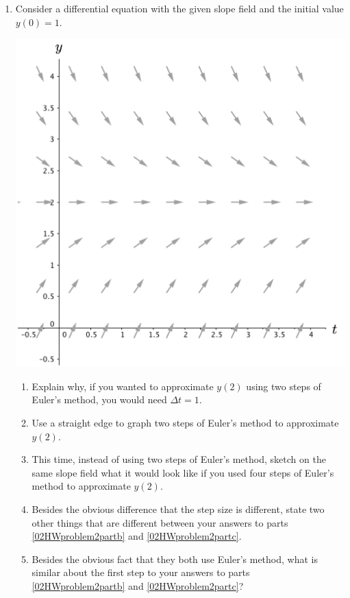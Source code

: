 \begin{enumerate}

\clearpage

\item Consider a differential equation with the given slope field and the initial value $y(0)=1$. \label{02HWproblem2}
\begin{center}
\includegraphics[width=5in]{02/02HWSlopeField2.png}
\end{center}
\begin{enumerate}
\item Explain why, if you wanted to approximate $y(2)$ using two steps of Euler's method, you would need $\Delta t = 1$.  \label{02HWproblem2parta}
\item Use a straight edge to graph two steps of Euler's method to approximate $y(2)$. \label{02HWproblem2partb}
\item This time, instead of using two steps of Euler's method, sketch on the same slope field what it would look like if you used four steps of Euler's method to approximate $y(2)$. \label{02HWproblem2partc}
\item Besides the obvious difference that the step size is different, state two other things that are different between your answers to parts \ref{02HWproblem2partb} and \ref{02HWproblem2partc}. \label{02HWproblem2partd}
\item Besides the obvious fact that they both use Euler's method, what is similar about the first step to your answers to parts \ref{02HWproblem2partb} and \ref{02HWproblem2partc}? \label{02HWproblem2parte}


\end{enumerate}
\end{enumerate}
